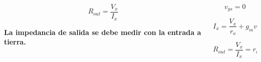 \begin{frame}[t]
\begin{columns}
\begin{column}{0.5\textwidth}
            \[ R_{out} = \dfrac{V_x}{I_x} \]

            \vspace{3mm}
            \begin{center}
                \textbf{La impedancia de salida se debe medir con la entrada a tierra.}
            \end{center}
        \end{column}
        \begin{column}{0.5\textwidth}
            \[ v_{gs} = 0 \]

            \[ I_x = \dfrac{V_x}{r_o} + g_m v_{gs} \]
    
            \[ \boxed{R_{out} = \dfrac{V_x}{I_x} = r_o} \]
        \end{column}
    \end{columns}
\end{frame}



